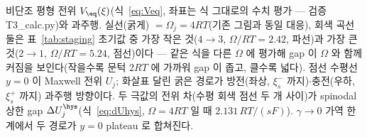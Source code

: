 \caption{비단조 평형 전위 $V_\eq(\xi)$(식~\eqref{eq:Veq}, 좌표는 식 그대로의 수치 평가 — 검증
T3\_calc.py)와 과주행. 실선(굵게) $=\Omega_j{=}4RT$(기존 그림과 동일 대응), 회색 곡선 둘은
표~\ref{tab:staging} 초기값 중 가장 작은 것($4\!\to\!3$, $\Omega/RT{=}2.42$, 파선)과 가장 큰
것($2\!\to\!1$, $\Omega/RT{=}5.24$, 점선)이다 — 같은 식을 다른 $\Omega$ 에 평가해 gap 이 $\Omega$
와 함께 커짐을 보인다(작을수록 문턱 $2RT$ 에 가까워 gap 이 좁고, 클수록 넓다). 점선 수평선 $y{=}0$ 이
Maxwell 전위 $U_j$; 화살표 달린 굵은 경로가 방전(좌상, $\xi_s^-$ 까지)$\cdot$충전(우하, $\xi_s^+$ 까지) 과주행
방향이다. 두 극값의 전위 차(수평 회색 점선 두 개 사이)가 spinodal 상한 gap $\Delta U_j^\hys$(식~\eqref{eq:dUhys},
$\Omega{=}4RT$ 일 때 $2.131\,RT/(sF)$). $\gamma\to0$ 가역 한계에서 두 경로가 $y=0$ plateau 로 합쳐진다.}
\label{fig:hysloop}
